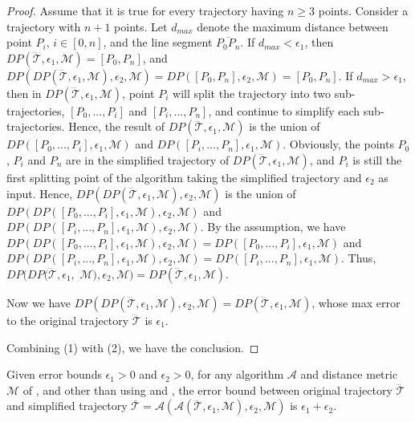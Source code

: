 \begin{proof}
	\item Assume that it is true for every trajectory  having $n \ge 3$ points.
	Consider a trajectory with $n+1$ points. Let $d_{max}$ denote the maximum distance between point $P_i$, $i \in [0,n]$, and the line segment $\overline{P_0P_{n}}$.
	If $d_{max}<\epsilon_1$, then $DP(\dddot{\mathcal{T}}, \epsilon_1, \mathcal{M})=[P_0, P_{n}]$, and $DP(DP(\dddot{\mathcal{T}}, \epsilon_1, \mathcal{M}), \epsilon_2, \mathcal{M}) = DP([P_0, P_{n}], \epsilon_2, \mathcal{M})=[P_0, P_{n}]$.
	If $d_{max} > \epsilon_1$, then in $DP(\dddot{\mathcal{T}}, \epsilon_1, \mathcal{M})$, point $P_i$ will split the trajectory  into two sub-trajectories, \ie $[P_0, ..., P_i]$ and $[P_{i}, ..., P_{n}]$, and continue to simplify each sub-trajectories. Hence, the result of $DP(\dddot{\mathcal{T}}, \epsilon_1, \mathcal{M})$ is the union of $DP([P_0, ..., P_i], \epsilon_1, \mathcal{M})$ and $DP([P_i, ..., P_n], \epsilon_1, \mathcal{M})$.
	Obviously, the points $P_0$, $P_i$ and $P_n$ are in the simplified trajectory of $DP(\dddot{\mathcal{T}}, \epsilon_1, \mathcal{M})$, and $P_i$ is still the first splitting point of the \dpa algorithm taking the simplified trajectory and $\epsilon_2$ as input. Hence, $DP(DP(\dddot{\mathcal{T}}, \epsilon_1, \mathcal{M}), \epsilon_2, \mathcal{M})$ is the union of $DP(DP([P_0, ..., P_i], \epsilon_1, \mathcal{M}), \epsilon_2, \mathcal{M})$ and $DP(DP([P_i, ..., P_n], \epsilon_1, \mathcal{M}), \epsilon_2, \mathcal{M})$. By the assumption, we have $DP(DP([P_0, ..., P_i], \epsilon_1, \mathcal{M}), \epsilon_2, \mathcal{M}) = DP([P_0, ..., P_i], \epsilon_1, \mathcal{M})$ and $DP(DP([P_i, ..., P_n], \epsilon_1, \mathcal{M}), \epsilon_2, \mathcal{M}) = DP([P_i, ..., P_n], \epsilon_1, \mathcal{M})$. Thus, $DP(DP(\dddot{\mathcal{T}}, \epsilon_1,$ $\mathcal{M}), \epsilon_2, \mathcal{M}) = DP(\dddot{\mathcal{T}}, \epsilon_1, \mathcal{M})$.

\item  Now we have $DP(DP(\dddot{\mathcal{T}}, \epsilon_1, \mathcal{M}), \epsilon_2, \mathcal{M}) = DP(\dddot{\mathcal{T}}, \epsilon_1, \mathcal{M})$, whose max error to the original trajectory $\dddot{\mathcal{T}}$ is $\epsilon_1$.
\ei

Combining (1) with (2), we have the conclusion.
\end{proof}


\begin{proposition}
	\label{theo-aging-distance}
	Given error bounds $\epsilon_1>0$ and $\epsilon_2>0$, for any \lsa algorithm $\mathcal{A}$ and distance metric $\mathcal{M}$ of \ped, \sed and \dad other than \dpa using \ped and \sed, the error bound between original trajectory $\dddot{\mathcal{T}}$ and simplified trajectory $\overline{\mathcal{T}}=\mathcal{A}(\mathcal{A}(\dddot{\mathcal{T}}, \epsilon_1, \mathcal{M}), \epsilon_2, \mathcal{M})$ is $\epsilon_1+ \epsilon_2$.
\end{proposition}

